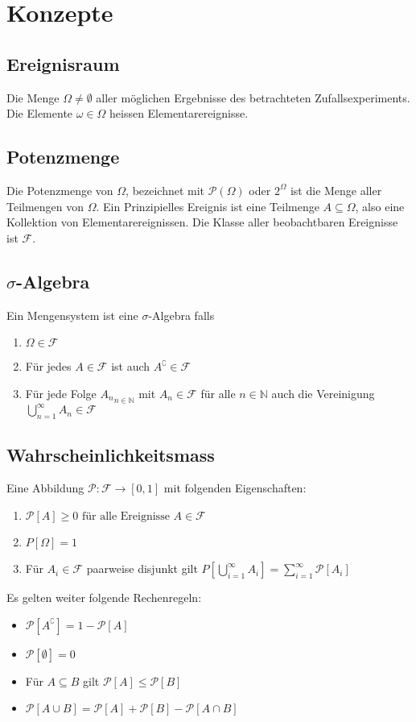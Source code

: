 \documentclass[8pt]{extarticle}
\newcommand{\N}{\mathbb{N}}
\newcommand{\F}{\mathcal{F}}
\begin{document}
\setlength{\columnseprule}{0.4pt}
\begin{multicols*}{3}

  \hypertarget{sec:0}{\section{Konzepte}}
  \subsection*{Ereignisraum}
  Die Menge $\Omega \neq \emptyset$ aller möglichen Ergebnisse des betrachteten
  Zufallsexperiments. Die Elemente $\omega \in \Omega$ heissen
  Elementarereignisse.
  \subsection*{Potenzmenge}
  Die Potenzmenge von $\Omega$, bezeichnet mit $\mathcal{P} (\Omega)$ oder
  $2^\Omega$ ist die Menge aller Teilmengen von $\Omega$. Ein Prinzipielles
  Ereignis ist eine Teilmenge $A \subseteq \Omega$, also eine Kollektion von
  Elementarereignissen. Die Klasse aller beobachtbaren Ereignisse ist
  $\mathcal{F}$.
  \subsection*{$\sigma$-Algebra}
  Ein Mengensystem ist eine $\sigma$-Algebra falls
  \begin{enumerate}[label=  (\arabic*)]
    \item $\Omega \in \mathcal{F}$
    \item Für jedes $A \in \mathcal{F}$ ist auch $A^\complement \in \mathcal{F}$
    \item Für jede Folge ${A_n}_{n \in \mathbb{N}}$ mit $A_n \in \mathcal{F}$ für alle $n
            \in \N$ auch die Vereinigung $\bigcup_{n = 1}^\infty A_n \in \F$
  \end{enumerate}
  \subsection*{Wahrscheinlichkeitsmass}
  Eine Abbildung $\mathcal{P}: \F \to [0, 1]$ mit folgenden Eigenschaften:
  \begin{enumerate}[label= (\arabic*)]
    \item $\mathcal{P}[A] \geq 0 \text{ für alle Ereignisse } A \in \F$
    \item $P[\Omega] = 1$
    \item Für $A_i \in \F$ paarweise disjunkt gilt $P[\bigcup_{i = 1}^\infty A_i] =
            \sum_{i = 1}^\infty \mathcal{P}[A_i]$
  \end{enumerate}
  Es gelten weiter folgende Rechenregeln:
  \begin{itemize}
    \item $\mathcal{P}[A^\complement] = 1 - \mathcal{P}[A]$
    \item $\mathcal{P}[\emptyset] = 0$
    \item Für $A \subseteq B$ gilt $\mathcal{P}[A] \leq \mathcal{P}[B]$
    \item $\mathcal{P}[A \cup B] = \mathcal{P}[A] + \mathcal{P}[B] - \mathcal{P}[A \cap B]$
  \end{itemize}

\end{multicols*}
\end{document}
